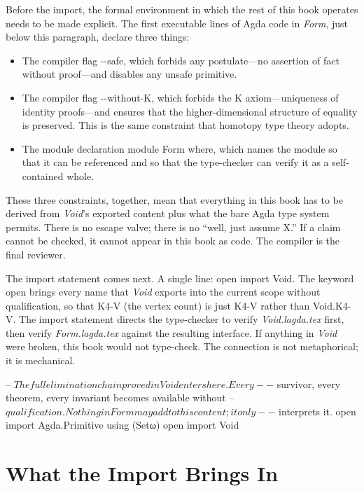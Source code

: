 \documentclass[11pt,a4paper]{book}
\newcommand{\AgdaFlag}[1]{\texttt{-{}-#1}}
\def\texttt#1{#1}%
\begin{document}
Before the import, the formal environment in which the rest of this book operates needs to be made explicit. The first executable lines of Agda code in \textit{Form}, just below this paragraph, declare three things:

\begin{itemize}
\item The compiler flag \AgdaFlag{safe}, which forbids any \texttt{postulate}---no assertion of fact without proof---and disables any unsafe primitive.
\item The compiler flag \AgdaFlag{without-K}, which forbids the K axiom---uniqueness of identity proofs---and ensures that the higher-dimensional structure of equality is preserved. This is the same constraint that homotopy type theory adopts.
\item The module declaration \texttt{module Form where}, which names the module so that it can be referenced and so that the type-checker can verify it as a self-contained whole.
\end{itemize}

These three constraints, together, mean that everything in this book has to be derived from \textit{Void}'s exported content plus what the bare Agda type system permits. There is no escape valve; there is no ``well, just assume X.'' If a claim cannot be checked, it cannot appear in this book as code. The compiler is the final reviewer.

The import statement comes next. A single line: \texttt{open import Void}. The keyword \texttt{open} brings every name that \textit{Void} exports into the current scope without qualification, so that \texttt{K4-V} (the vertex count) is just \texttt{K4-V} rather than \texttt{Void.K4-V}. The import statement directs the type-checker to verify \textit{Void.lagda.tex} first, then verify \textit{Form.lagda.tex} against the resulting interface. If anything in \textit{Void} were broken, this book would not type-check. The connection is not metaphorical; it is mechanical.

\begin{code}
-- $ The full elimination chain proved in Void enters here.  Every
-- $ survivor, every theorem, every invariant becomes available without
-- $ qualification.  Nothing in Form may add to this content; it only
-- $ interprets it.
open import Agda.Primitive using (Setω)
open import Void
\end{code}

\section*{What the Import Brings In}
\end{document}
